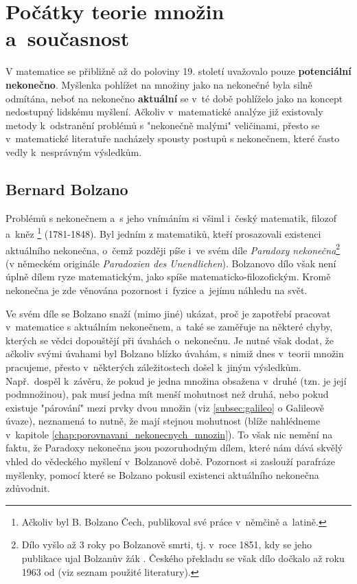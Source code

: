 \section{Počátky teorie množin a~současnost}

V matematice se přibližně až do poloviny 19. století uvažovalo pouze \textbf{potenciální nekonečno}. Myšlenka pohlížet na množiny jako na nekonečné byla silně odmítána, neboť na nekonečno \textbf{aktuální} se v~té době pohlíželo jako na koncept nedostupný lidskému myšlení. Ačkoliv v~matematické analýze již existovaly metody k~odstranění problémů s "nekonečně malými" veličinami, přesto se v~matematické literatuře nacházely spousty postupů s nekonečnem, které často vedly k~nesprávným výsledkům.
\subsection{Bernard Bolzano}\label{subsec:bolzano}
Problémů s nekonečnem a~s jeho vnímáním si všiml i~český matematik, filozof a~kněz \footnote{Ačkoliv byl B. Bolzano Čech, publikoval své práce v~němčině a~latině.} \mbox{(1781-1848)}. Byl jedním z matematiků, kteří prosazovali existenci aktuálního nekonečna, o~čemž později píše i~ve svém díle \emph{Paradoxy nekonečna}\footnote{Dílo vyšlo až 3 roky po Bolzanově smrti, tj. v~roce 1851, kdy se jeho publikace ujal Bolzanův žák . Českého překladu se však dílo dočkalo až roku 1963 od  (viz seznam použité literatury).} (v německém originále \emph{Paradoxien des Unendlichen}). Bolzanovo dílo však není úplně dílem ryze matematickým, jako spíše matematicko-filozofickým. Kromě nekonečna je zde věnována pozornost i~fyzice a~jejímu náhledu na svět.\par
Ve svém díle se Bolzano snaží (mimo jiné) ukázat, proč je zapotřebí pracovat v~matematice s aktuálním nekonečnem, a~také se zaměřuje na některé chyby, kterých se vědci dopouštějí při úvahách o~nekonečnu. Je nutné však dodat, že ačkoliv svými úvahami byl Bolzano blízko úvahám, s nimiž dnes v~teorii množin pracujeme, přesto v~některých záležitostech došel k~jiným výsledkům. Např.~dospěl k~závěru, že pokud je jedna množina obsažena v~druhé (tzn. je její podmnožinou), pak musí jedna mít menší mohutnost než druhá, nebo pokud existuje "párování" mezi prvky dvou množin (viz \ref{subsec:galileo}
o Galileově úvaze), neznamená to nutně, že mají stejnou mohutnost (blíže nahlédneme v~kapitole \ref{chap:porovnavani_nekonecnych_mnozin}). To však nic nemění na faktu, že Paradoxy nekonečna jsou pozoruhodným dílem, které nám dává skvělý vhled do vědeckého myšlení v~Bolzanově době. Pozornost si zaslouží parafráze myšlenky, pomocí které se Bolzano pokusil existenci aktuálního nekonečna zdůvodnit.

